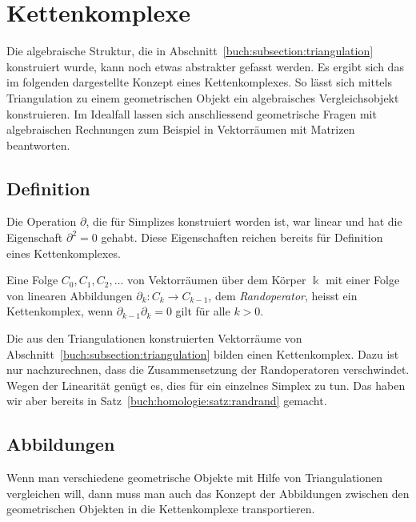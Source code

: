 %
%
%
\section{Kettenkomplexe
\label{buch:section:komplex}}
Die algebraische Struktur, die in Abschnitt~\ref{buch:subsection:triangulation}
konstruiert wurde, kann noch etwas abstrakter gefasst werden.
Es ergibt sich das im folgenden dargestellte Konzept eines Kettenkomplexes.
So lässt sich mittels Triangulation zu einem geometrischen Objekt ein algebraisches 
Vergleichsobjekt konstruieren.
Im Idealfall lassen sich anschliessend geometrische Fragen mit
algebraischen Rechnungen zum Beispiel in Vektorräumen mit Matrizen
beantworten.

\subsection{Definition
\label{buch:subsection:kettenkomplex-definition}}
Die Operation $\partial$, die für Simplizes konstruiert worden ist,
war linear und hat die Eigenschaft $\partial^2=0$ gehabt.
Diese Eigenschaften reichen bereits für Definition eines Kettenkomplexes.

\begin{definition}
Eine Folge $C_0,C_1,C_2,\dots$ von Vektorräumen über dem Körper $\Bbbk$
mit einer Folge von linearen Abbildungen
$\partial_k\colon C_k \to C_{k-1}$, dem {\em Randoperator},
heisst ein Kettenkomplex, wenn $\partial_{k-1}\partial_k=0$ gilt
für alle $k>0$.
\end{definition}

Die aus den Triangulationen konstruierten Vektorräume von
Abschnitt~\ref{buch:subsection:triangulation} bilden einen
Kettenkomplex.
Dazu ist nur nachzurechnen, dass die Zusammensetzung der
Randoperatoren verschwindet.
Wegen der Linearität genügt es, dies für ein einzelnes Simplex zu tun.
Das haben wir aber bereits in Satz~\ref{buch:homologie:satz:randrand}
gemacht.

\subsection{Abbildungen
\label{buch:subsection:abbildungen}}
Wenn man verschiedene geometrische Objekte mit Hilfe von Triangulationen
vergleichen will, dann muss man auch das Konzept der Abbildungen zwischen
den geometrischen Objekten in die Kettenkomplexe transportieren.

